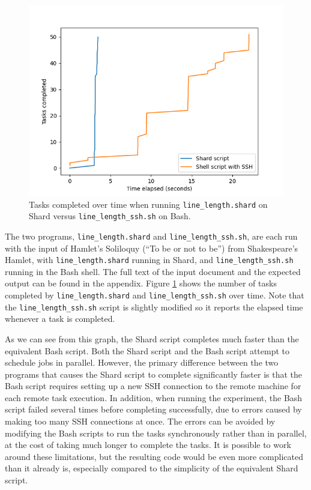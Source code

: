 \documentclass[oneside]{report}
\begin{document}
\begin{figure}[h]
  \begin{center}
    \includegraphics[scale=0.9]{img/experiments/e12_1621061398991.png}
    \caption{Tasks completed over time when running \texttt{line\_length.shard} on Shard versus \texttt{line\_length\_ssh.sh} on Bash.}
    \label{fig:linelength}
  \end{center}
\end{figure}

\begin{sloppypar}
  The two programs, \texttt{line\_length.shard} and \texttt{line\_length\_ssh.sh}, are each run with the input of Hamlet's Soliloquy (``To be or not to be'') from Shakespeare's Hamlet, with \texttt{line\_length.shard} running in Shard, and \texttt{line\_length\_ssh.sh} running in the Bash shell.
  The full text of the input document and the expected output can be found in the appendix.
  Figure \ref{fig:linelength} shows the number of tasks completed by \texttt{line\_length.shard} and \texttt{line\_length\_ssh.sh} over time.
  Note that the \texttt{line\_length\_ssh.sh} script is slightly modified so it reports the elapsed time whenever a task is completed.
\end{sloppypar}

As we can see from this graph, the Shard script completes much faster than the equivalent Bash script.
Both the Shard script and the Bash script attempt to schedule jobs in parallel.
However, the primary difference between the two programs that causes the Shard script to complete significantly faster is that the Bash script requires setting up a new SSH connection to the remote machine for each remote task execution.
In addition, when running the experiment, the Bash script failed several times before completing successfully, due to errors caused by making too many SSH connections at once.
The errors can be avoided by modifying the Bash scripts to run the tasks synchronously rather than in parallel, at the cost of taking much longer to complete the tasks.
It is possible to work around these limitations, but the resulting code would be even more complicated than it already is, especially compared to the simplicity of the equivalent Shard script.
\end{document}
